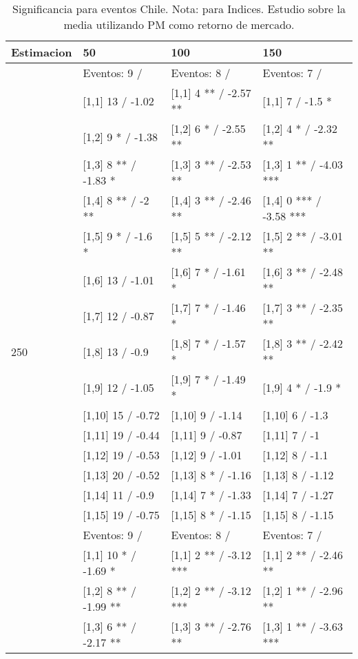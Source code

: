 \begin{table}

\caption{Significancia para eventos Chile. Nota: para Indices. Estudio sobre la media utilizando PM como retorno de mercado.}
\centering
\begin{tabular}[t]{llll}
\toprule
Estimacion & 50 & 100 & 150\\
\midrule
 & Eventos:  9 / & Eventos:  8 / & Eventos:  7 /\\
 & {}[1,1] 13  / -1.02 & {}[1,1] 4 ** / -2.57 ** & {}[1,1] 7  / -1.5 *\\
 & {}[1,2] 9 * / -1.38 & {}[1,2] 6 * / -2.55 ** & {}[1,2] 4 * / -2.32 **\\
 & {}[1,3] 8 ** / -1.83 * & {}[1,3] 3 ** / -2.53 ** & {}[1,3] 1 ** / -4.03 ***\\
 & {}[1,4] 8 ** / -2 ** & {}[1,4] 3 ** / -2.46 ** & {}[1,4] 0 *** / -3.58 ***\\
\addlinespace
 & {}[1,5] 9 * / -1.6 * & {}[1,5] 5 ** / -2.12 ** & {}[1,5] 2 ** / -3.01 **\\
 & {}[1,6] 13  / -1.01 & {}[1,6] 7 * / -1.61 * & {}[1,6] 3 ** / -2.48 **\\
 & {}[1,7] 12  / -0.87 & {}[1,7] 7 * / -1.46 * & {}[1,7] 3 ** / -2.35 **\\
250 & {}[1,8] 13  / -0.9 & {}[1,8] 7 * / -1.57 * & {}[1,8] 3 ** / -2.42 **\\
 & {}[1,9] 12  / -1.05 & {}[1,9] 7 * / -1.49 * & {}[1,9] 4 * / -1.9 *\\
\addlinespace
 & {}[1,10] 15  / -0.72 & {}[1,10] 9  / -1.14 & {}[1,10] 6  / -1.3\\
 & {}[1,11] 19  / -0.44 & {}[1,11] 9  / -0.87 & {}[1,11] 7  / -1\\
 & {}[1,12] 19  / -0.53 & {}[1,12] 9  / -1.01 & {}[1,12] 8  / -1.1\\
 & {}[1,13] 20  / -0.52 & {}[1,13] 8 * / -1.16 & {}[1,13] 8  / -1.12\\
 & {}[1,14] 11  / -0.9 & {}[1,14] 7 * / -1.33 & {}[1,14] 7  / -1.27\\
\addlinespace
 & {}[1,15] 19  / -0.75 & {}[1,15] 8 * / -1.15 & {}[1,15] 8  / -1.15\\
 & Eventos:  9 / & Eventos:  8 / & Eventos:  7 /\\
 & {}[1,1] 10 * / -1.69 * & {}[1,1] 2 ** / -3.12 *** & {}[1,1] 2 ** / -2.46 **\\
 & {}[1,2] 8 ** / -1.99 ** & {}[1,2] 2 ** / -3.12 *** & {}[1,2] 1 ** / -2.96 **\\
 & {}[1,3] 6 ** / -2.17 ** & {}[1,3] 3 ** / -2.76 ** & {}[1,3] 1 ** / -3.63 ***\\

\end{tabular}
\end{table}
